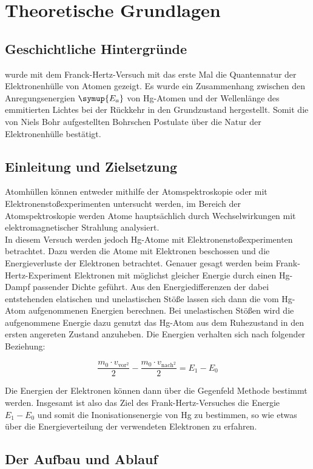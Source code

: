 \section{Theoretische Grundlagen}

    \subsection{Geschichtliche Hintergründe}

         wurde mit dem Franck-Hertz-Versuch mit das erste Mal die Quantennatur der Elektronenhülle von Atomen gezeigt. Es wurde ein 
        Zusammenhang zwischen den Anregungsenergien $\symup{E_a}$ von Hg-Atomen und der Wellenlänge des emmitierten Lichtes bei der Rückkehr 
        in den Grundzustand hergestellt. Somit die von Niels Bohr aufgestellten Bohrschen Postulate über die Natur der Elektronenhülle 
        bestätigt. 

    \subsection{Einleitung und Zielsetzung}

        \noindent Atomhüllen können entweder mithilfe der Atomspektroskopie oder mit Elektronenstoßexperimenten untersucht werden, im Bereich der 
        Atomspektroskopie werden Atome hauptsächlich durch Wechselwirkungen mit elektromagnetischer Strahlung analysiert.\\
        \noindent In diesem Versuch werden jedoch Hg-Atome mit Elektronenstoßexperimenten betrachtet. Dazu werden die Atome mit Elektronen 
        beschossen und die Energieverluste der Elektronen betrachtet. Genauer gesagt werden beim Frank-Hertz-Experiment Elektronen mit 
        möglichst gleicher Energie durch einen Hg-Dampf passender Dichte geführt. Aus den Energiedifferenzen der dabei entstehenden elatischen 
        und unelastischen Stöße lassen sich dann die vom Hg-Atom aufgenommenen Energien berechnen. Bei unelastischen Stößen wird die 
        aufgenommene Energie dazu genutzt das Hg-Atom aus dem Ruhezustand in den ersten angereten Zustand anzuheben. Die Energien verhalten sich 
        nach folgender Beziehung:

        \begin{equation*}
            \frac{m_0 \cdot v_{\text{vor}^2}}{2} - \frac{m_0 \cdot v_{\text{nach}^2}}{2} = E_1 - E_0
        \end{equation*}

        \noindent Die Energien der Elektronen können dann über die Gegenfeld Methode bestimmt werden.
        Insgesamt ist also das Ziel des Frank-Hertz-Versuches die Energie $E_1 - E_0$ und somit die Inonisationsenergie von Hg zu bestimmen, 
        so wie etwas über die Energieverteilung der verwendeten Elektronen zu erfahren.

    \subsection{Der Aufbau und Ablauf}

        \noindent 